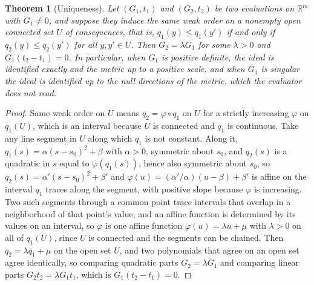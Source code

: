 \documentclass[11pt]{article}
\newtheorem{theorem}{Theorem}
\theoremstyle{definition}
\theoremstyle{remark}
\newcommand{\R}{\mathbb{R}}
\begin{document}
\begin{theorem}[Uniqueness]
\label{thm:unique}
Let $(G_{1},t_{1})$ and $(G_{2},t_{2})$ be two evaluations on $\R^{m}$ with $G_{1}\ne0$, and suppose they induce the same weak order on a nonempty open connected set $U$ of consequences, that is, $q_{1}(y)\le q_{1}(y')$ if and only if $q_{2}(y)\le q_{2}(y')$ for all $y,y'\in U$.
Then $G_{2}=\lambda G_{1}$ for some $\lambda>0$ and $G_{1}(t_{2}-t_{1})=0$.
In particular, when $G_{1}$ is positive definite, the ideal is identified exactly and the metric up to a positive scale, and when $G_{1}$ is singular the ideal is identified up to the null directions of the metric, which the evaluator does not read.
\end{theorem}

\begin{proof}
Same weak order on $U$ means $q_{2}=\varphi\circ q_{1}$ on $U$ for a strictly increasing $\varphi$ on $q_{1}(U)$, which is an interval because $U$ is connected and $q_{1}$ is continuous.
Take any line segment in $U$ along which $q_{1}$ is not constant. Along it, $q_{1}(s)=\alpha(s-s_{0})^{2}+\beta$ with $\alpha>0$, symmetric about $s_{0}$, and $q_{2}(s)$ is a quadratic in $s$ equal to $\varphi(q_{1}(s))$, hence also symmetric about $s_{0}$, so $q_{2}(s)=\alpha'(s-s_{0})^{2}+\beta'$ and $\varphi(u)=(\alpha'/\alpha)(u-\beta)+\beta'$ is affine on the interval $q_{1}$ traces along the segment, with positive slope because $\varphi$ is increasing.
Two such segments through a common point trace intervals that overlap in a neighborhood of that point's value, and an affine function is determined by its values on an interval, so $\varphi$ is one affine function $\varphi(u)=\lambda u+\mu$ with $\lambda>0$ on all of $q_{1}(U)$, since $U$ is connected and the segments can be chained.
Then $q_{2}=\lambda q_{1}+\mu$ on the open set $U$, and two polynomials that agree on an open set agree identically, so comparing quadratic parts $G_{2}=\lambda G_{1}$ and comparing linear parts $G_{2}t_{2}=\lambda G_{1}t_{1}$, which is $G_{1}(t_{2}-t_{1})=0$.
\end{proof}
\end{document}
